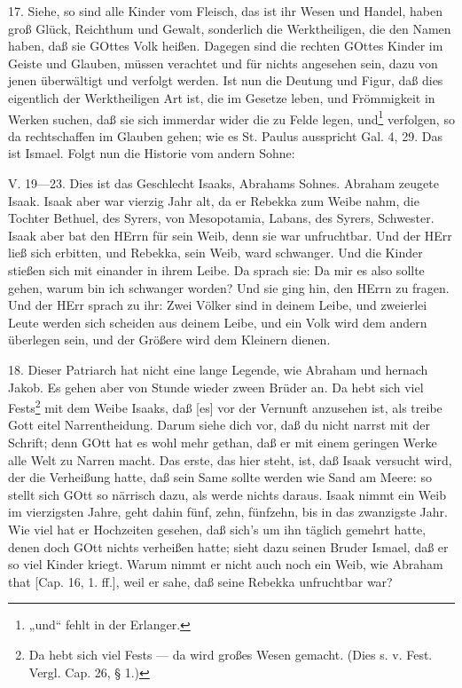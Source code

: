 17. Siehe, so sind alle Kinder vom Fleisch, das ist ihr Wesen und Handel, haben groß Glück,
Reichthum und Gewalt, sonderlich die Werktheiligen, die den Namen haben, daß sie GOttes Volk heißen. Dagegen sind die rechten GOttes Kinder im Geiste und Glauben, müssen verachtet und für nichts angesehen sein, dazu von jenen überwältigt und verfolgt werden. Ist nun die Deutung und Figur, daß dies eigentlich der Werktheiligen Art ist, die im Gesetze leben, und Frömmigkeit in Werken suchen, daß sie sich immerdar wider die zu Felde legen, und\footnote{„und“ fehlt in der Erlanger.} verfolgen, so da rechtschaffen im Glauben gehen; wie es St. Paulus ausspricht Gal. 4, 29. Das ist Ismael. Folgt nun die Historie vom andern Sohne:

\begin{schriftzitat}
V. 19—23. Dies ist das Geschlecht Isaaks, Abrahams Sohnes. Abraham zeugete Isaak. Isaak aber war vierzig Jahr alt, da er Rebekka zum Weibe nahm, die Tochter Bethuel, des Syrers, von Mesopotamia, Labans, des Syrers, Schwester. Isaak aber bat den HErrn für sein Weib, denn sie war unfruchtbar. Und der HErr ließ sich erbitten, und Rebekka, sein Weib, ward schwanger. Und die Kinder stießen sich mit einander in ihrem Leibe. Da sprach sie: Da mir es also sollte gehen, warum bin ich schwanger worden? Und sie ging hin, den HErrn zu fragen. Und der HErr sprach zu ihr: Zwei Völker sind in deinem Leibe, und zweierlei Leute werden sich scheiden aus deinem Leibe, und ein Volk wird dem andern überlegen sein, und der Größere wird dem Kleinern dienen.
\end{schriftzitat}

18. Dieser Patriarch hat nicht eine lange Legende, wie Abraham und hernach Jakob. Es gehen aber von Stunde wieder zween Brüder an. Da hebt sich viel Fests\footnote{Da hebt sich viel Fests — da wird großes Wesen gemacht. (Dies s. v. Fest. Vergl. Cap. 26, § 1.)} mit dem Weibe Isaaks, daß [es] vor der Vernunft anzusehen ist, als treibe Gott eitel Narrentheidung. Darum siehe dich vor, daß du nicht narrst mit der Schrift; denn GOtt hat es wohl mehr gethan, daß er mit einem geringen Werke alle Welt zu Narren macht. Das erste, das hier steht, ist, daß Isaak versucht wird, der die Verheißung hatte, daß sein Same sollte werden wie Sand am Meere: so stellt sich GOtt so närrisch dazu, als werde nichts daraus. Isaak nimmt ein Weib im vierzigsten Jahre, geht dahin fünf, zehn, fünfzehn, bis in das zwanzigste Jahr. Wie viel hat er Hochzeiten gesehen, daß sich’s um ihn täglich gemehrt hatte, denen doch GOtt nichts verheißen hatte; sieht dazu seinen Bruder Ismael, daß er so viel Kinder kriegt. Warum nimmt er nicht auch noch ein Weib, wie Abraham that [Cap. 16, 1. ff.], weil er sahe, daß seine Rebekka unfruchtbar war?

